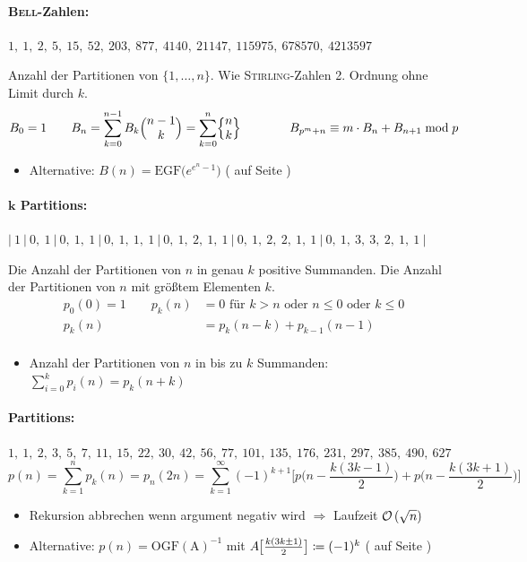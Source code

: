 \paragraph{\textsc{Bell}-Zahlen:}
$1,~1,~2,~5,~15,~52,~203,~877,~4140,~21147,~115975,~678570,~4213597$

Anzahl der Partitionen von $\{1, \ldots, n\}$.
Wie \textsc{Stirling}-Zahlen 2. Ordnung ohne Limit durch $k$.
\vspace{-0.2cm}%
\[B_0 = 1 \qquad
B_n = \sum\limits_{k = 0}^{n - 1} B_k\Bigl( \begin{matrix} n-1 \\ k \end{matrix} \Bigr)
= \sum\limits_{k = 0}^{n}\Bigl\{ \begin{matrix} n \\ k \end{matrix} \Bigr\}\qquad\qquad B_{p^m+n}\equiv m\cdot B_n + B_{n+1} \bmod{p}\]
\begin{itemize}
	\item Alternative: $B(n) = \mathrm{EGF}\big(e^{e^n-1}\big)$ ( auf Seite \pageref{code:math/transforms/seriesOperations.cpp})
\end{itemize}

\paragraph{$\boldsymbol{k}$ Partitions:}
$|~1~|~0,~1~|~0,~1,~1~|~0,~1,~1,~1~|~0,~1,~2,~1,~1~|~0,~1,~2,~2,~1,~1~|~0,~1,~3,~3,~2,~1,~1~|$

Die Anzahl der Partitionen von $n$ in genau $k$ positive Summanden.
Die Anzahl der Partitionen von $n$ mit größtem Elementen $k$.
\begin{align*}
	p_0(0)=1 \qquad p_k(n)&=0 \text{ für } k > n \text{ oder } n \leq 0 \text{ oder } k \leq 0\\[-2pt]
	p_k(n)&= p_k(n-k) + p_{k-1}(n-1)\\[-0.55cm]
\end{align*}
\begin{itemize}
	\item Anzahl der Partitionen von $n$ in bis zu $k$ Summanden: $\sum\limits_{i=0}^{k}p_i(n)=p_k(n+k)$
\end{itemize}

\paragraph{Partitions:}
$1,~1,~2,~3,~5,~7,~11,~15,~22,~30,~42,~56,~77,~101,~135,~176,~231,~297,~385,~490,~627$
\[p(n)=\sum_{k=1}^{n} p_k(n)=p_n(2n)=\sum\limits_{k=1}^\infty(-1)^{k+1}\bigg[p\bigg(n - \frac{k(3k-1)}{2}\bigg) + p\bigg(n - \frac{k(3k+1)}{2}\bigg)\bigg]\]
\begin{itemize}
	\item Rekursion abbrechen wenn argument negativ wird $\Longrightarrow$ Laufzeit $\mathcal{O}\left(\sqrt{n}\right)$
	\item Alternative: $p(n) = \mathrm{OGF(A)}^{-1}$ mit $A\mkern-1mu\big[\frac{k(3k\pm1)}{2}\big]\coloneqq(-1)^k$  ( auf Seite \pageref{code:math/transforms/seriesOperations.cpp})
\end{itemize}

